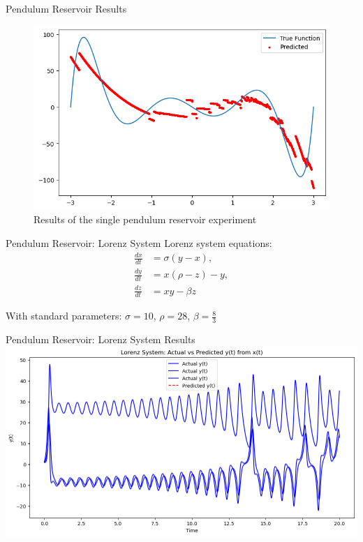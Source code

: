 \documentclass{beamer}
\begin{document}
\begin{frame}{Pendulum Reservoir Results}
\begin{figure}
\centering
\includegraphics[width=0.75\linewidth]{figures/pendulum_result_0.png}
\caption{Results of the single pendulum reservoir experiment}
\end{figure}
\end{frame}

\begin{frame}{Pendulum Reservoir: Lorenz System}
Lorenz system equations:
\begin{equation}
\begin{aligned}
\frac{dx}{dt} &= \sigma (y - x), \\
\frac{dy}{dt} &= x (\rho - z) - y, \\
\frac{dz}{dt} &= x y - \beta z
\end{aligned}
\end{equation}

With standard parameters: $\sigma = 10$, $\rho = 28$, $\beta = \frac{8}{3}$
\end{frame}

\begin{frame}{Pendulum Reservoir: Lorenz System Results}
\includegraphics[width=1\linewidth]{figures/lorentz_pendulum_1.png}
\caption{Actual vs Predicted for the Lorenz system using Pendulum reservoir}
\end{frame}
\end{document}
